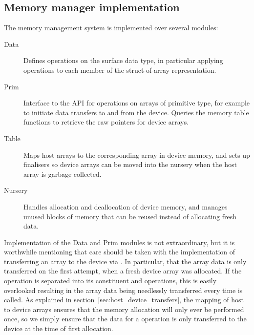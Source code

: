 \subsection{Memory manager implementation}

The memory management system is implemented over several modules:
%
\begin{description}
\item[Data] Defines operations on the surface  data type, in
    particular applying operations to each member of the struct-of-array
    representation.

\item[Prim] Interface to the \CUDA API for operations on arrays of primitive
    type, for example to initiate data transfers to and from the device. Queries
    the memory table functions to retrieve the raw pointers for device arrays.

\item[Table] Maps host arrays to the corresponding array in device memory, and
    sets up finalisers so device arrays can be moved into the nursery when the
    host array is garbage collected.

\item[Nursery] Handles allocation and deallocation of device memory, and
    manages unused blocks of memory that can be reused instead of allocating
    fresh data.
\end{description}

Implementation of the Data and Prim modules is not extraordinary, but it is
worthwhile mentioning that care should be taken with the implementation of
transferring an array to the device via . In particular, that the
array data is only transferred on the first  attempt, when a fresh
device array was allocated. If the  operation is separated into its
constituent  and  operations, this is easily overlooked
resulting in the array data being needlessly transferred every time 
is called. As explained in section~\ref{sec:host_device_transfers}, the mapping
of host to device arrays ensures that the memory allocation will only ever be
performed once, so we simply ensure that the data for a  operation is
only transferred to the device at the time of first allocation.

